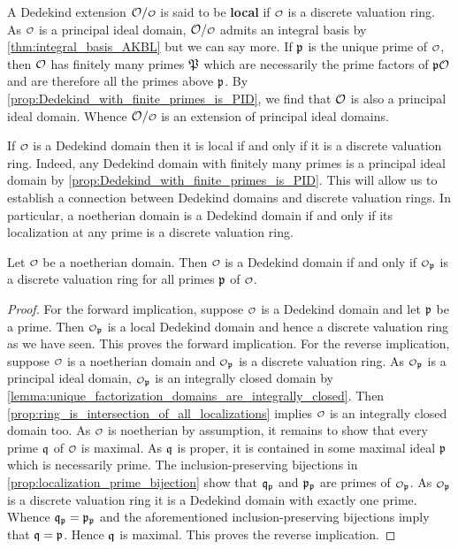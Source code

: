     A Dedekind extension \(\mc{O}/\smc{O}\) is said to be \textbf{local} if \(\smc{O}\) is a discrete valuation ring. As \(\smc{O}\) is a principal ideal domain, \(\mc{O}/\smc{O}\) admits an integral basis by \cref{thm:integral_basis_AKBL} but we can say more. If \(\mathfrak{p}\) is the unique prime of \(\smc{O}\), then \(\mathcal{O}\) has finitely many primes \(\mathfrak{P}\) which are necessarily the prime factors of \(\mathfrak{p}\mathcal{O}\) and are therefore all the primes above \(\mathfrak{p}\). By \cref{prop:Dedekind_with_finite_primes_is_PID}, we find that \(\mathcal{O}\) is also a principal ideal domain. Whence \(\mc{O}/\smc{O}\) is an extension of principal ideal domains. 
    
    If \(\smc{O}\) is a Dedekind domain then it is local if and only if it is a discrete valuation ring. Indeed, any Dedekind domain with finitely many primes is a principal ideal domain by \cref{prop:Dedekind_with_finite_primes_is_PID}. This will allow us to establish a connection between Dedekind domains and discrete valuation rings. In particular, a noetherian domain is a Dedekind domain if and only if its localization at any prime is a discrete valuation ring.

    \begin{theorem}\label{thm:Dedekind_if_and_only_if_all_localizations_are_discrete_valuation_rings}
      Let \(\smc{O}\) be a noetherian domain. Then \(\smc{O}\) is a Dedekind domain if and only if \(\smc{O}_{\mf{p}}\) is a discrete valuation ring for all primes \(\mathfrak{p}\) of \(\smc{O}\).
    \end{theorem}
    \begin{proof}
      For the forward implication, suppose \(\smc{O}\) is a Dedekind domain and let \(\mathfrak{p}\) be a prime. Then \(\smc{O}_{\mf{p}}\) is a local Dedekind domain and hence a discrete valuation ring as we have seen. This proves the forward implication. For the reverse implication, suppose \(\smc{O}\) is a noetherian domain and \(\smc{O}_{\mf{p}}\) is a discrete valuation ring. As \(\smc{O}_{\mf{p}}\) is a principal ideal domain, \(\smc{O}_{\mf{p}}\) is an integrally closed domain by \cref{lemma:unique_factorization_domains_are_integrally_closed}. Then \cref{prop:ring_is_intersection_of_all_localizations} implies \(\smc{O}\) is an integrally closed domain too. As \(\smc{O}\) is noetherian by assumption, it remains to show that every prime \(\mathfrak{q}\) of \(\smc{O}\) is maximal. As \(\mathfrak{q}\) is proper, it is contained in some maximal ideal \(\mathfrak{p}\) which is necessarily prime. The inclusion-preserving bijections in \cref{prop:localization_prime_bijection} show that \(\mathfrak{q}_{\mathfrak{p}}\) and \(\mathfrak{p}_{\mathfrak{p}}\) are primes of \(\smc{O}_{\mf{p}}\). As \(\smc{O}_{\mf{p}}\) is a discrete valuation ring it is a Dedekind domain with exactly one prime. Whence \(\mathfrak{q}_{\mathfrak{p}} = \mathfrak{p}_{\mathfrak{p}}\) and the aforementioned inclusion-preserving bijections imply that \(\mathfrak{q} = \mathfrak{p}\). Hence \(\mathfrak{q}\) is maximal. This proves the reverse implication.
    \end{proof}

